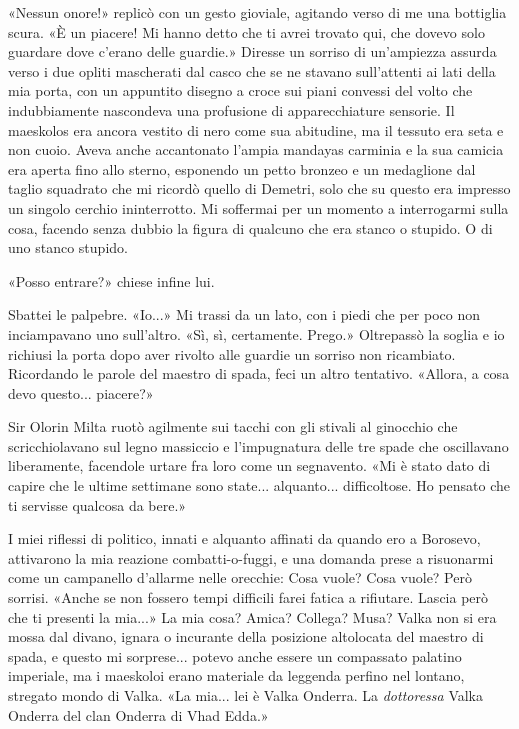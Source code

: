 «Nessun onore!» replicò con un gesto gioviale, agitando verso di me una
bottiglia scura. «È un piacere! Mi hanno detto che ti avrei trovato qui,
che dovevo solo guardare dove c'erano delle guardie.» Diresse un sorriso
di un'ampiezza assurda verso i due opliti mascherati dal casco che se ne
stavano sull'attenti ai lati della mia porta, con un appuntito disegno a
croce sui piani convessi del volto che indubbiamente nascondeva una
profusione di apparecchiature sensorie. Il maeskolos era ancora vestito
di nero come sua abitudine, ma il tessuto era seta e non cuoio. Aveva
anche accantonato l'ampia mandayas carminia e la sua camicia era aperta
fino allo sterno, esponendo un petto bronzeo e un medaglione dal taglio
squadrato che mi ricordò quello di Demetri, solo che su questo era
impresso un singolo cerchio ininterrotto. Mi soffermai per un momento a
interrogarmi sulla cosa, facendo senza dubbio la figura di qualcuno che
era stanco o stupido. O di uno stanco stupido.

«Posso entrare?» chiese infine lui.

Sbattei le palpebre. «Io...» Mi trassi da un lato, con i piedi che per
poco non inciampavano uno sull'altro. «Sì, sì, certamente. Prego.»
Oltrepassò la soglia e io richiusi la porta dopo aver rivolto alle
guardie un sorriso non ricambiato. Ricordando le parole del maestro di
spada, feci un altro tentativo. «Allora, a cosa devo questo... piacere?»

Sir Olorin Milta ruotò agilmente sui tacchi con gli stivali al ginocchio
che scricchiolavano sul legno massiccio e l'impugnatura delle tre spade
che oscillavano liberamente, facendole urtare fra loro come un
segnavento. «Mi è stato dato di capire che le ultime settimane sono
state... alquanto... difficoltose. Ho pensato che ti servisse qualcosa
da bere.»

I miei riflessi di politico, innati e alquanto affinati da quando ero a
Borosevo, attivarono la mia reazione combatti-o-fuggi, e una domanda
prese a risuonarmi come un campanello d'allarme nelle orecchie: Cosa
vuole? Cosa vuole? Però sorrisi. «Anche se non fossero tempi difficili
farei fatica a rifiutare. Lascia però che ti presenti la mia...» La mia
cosa? Amica? Collega? Musa? Valka non si era mossa dal divano, ignara o
incurante della posizione altolocata del maestro di spada, e questo mi
sorprese... potevo anche essere un compassato palatino imperiale, ma i
maeskoloi erano materiale da leggenda perfino nel lontano, stregato
mondo di Valka. «La mia... lei è Valka Onderra. La \emph{dottoressa}
Valka Onderra del clan Onderra di Vhad Edda.»

